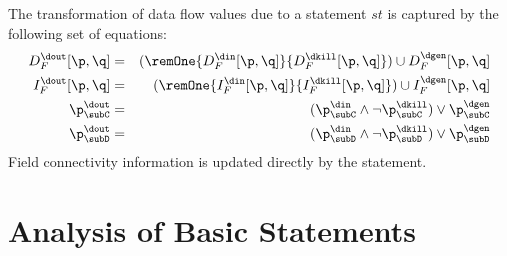 The transformation of data flow values due to a statement
$st$ is captured by the following set of equations:
\begin{eqnarray*}
  D_F^{\dout}[\p,\q] &=& (\remOne{D_F^{\din}[\p,\q]}{D_F^{\dkill}[\p,\q]}) \cup
  D_F^{\dgen}[\p,\q] \\
  I_F^{\dout}[\p,\q] &=& (\remOne{I_F^{\din}[\p,\q]}{I_F^{\dkill}[\p,\q]}) \cup
  I_F^{\dgen}[\p,\q] \\
  \p_{\subC}^{\dout} &=& (\p_{\subC}^{\din} \wedge
  \neg\p_{\subC}^{\dkill} ) \vee \p_{\subC}^{\dgen}  \\
  \p_{\subD}^{\dout} &=& (\p_{\subD}^{\din} \wedge
  \neg\p_{\subD}^{\dkill} ) \vee \p_{\subD}^{\dgen} 
\end{eqnarray*}
Field connectivity information is updated directly by the
statement.

\section{Analysis of Basic Statements} \label{Analysis_of_Basic_Statements}

